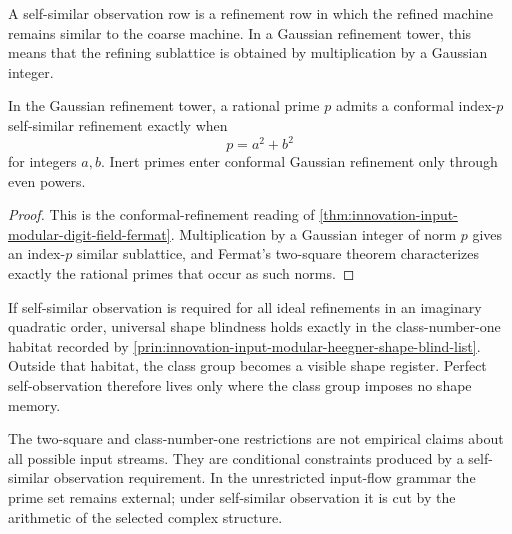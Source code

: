 \begin{definition}
\label{def:innovation-input-self-similar-observation-row}
A self-similar observation row is a refinement row in which the refined
machine remains similar to the coarse machine. In a Gaussian refinement
tower, this means that the refining sublattice is obtained by multiplication
by a Gaussian integer.
\end{definition}

\begin{theorem}
\label{thm:innovation-input-two-square-admissibility}
In the Gaussian refinement tower, a rational prime $p$ admits a
conformal index-$p$ self-similar refinement exactly when
$$
p=a^2+b^2
$$
for integers $a,b$. Inert primes enter conformal Gaussian refinement only
through even powers.
\end{theorem}

\begin{proof}
This is the conformal-refinement reading of
\autoref{thm:innovation-input-modular-digit-field-fermat}. Multiplication
by a Gaussian integer of norm $p$ gives an index-$p$ similar sublattice,
and Fermat's two-square theorem characterizes exactly the rational primes
that occur as such norms.
\end{proof}

\begin{principle}
\label{prin:innovation-input-heegner-habitat-self-observation}
If self-similar observation is required for all ideal refinements in an
imaginary quadratic order, universal shape blindness holds exactly in the
class-number-one habitat recorded by
\autoref{prin:innovation-input-modular-heegner-shape-blind-list}. Outside
that habitat, the class group becomes a visible shape register. Perfect
self-observation therefore lives only where the class group imposes no
shape memory.
\end{principle}

\begin{principle}
\label{prin:innovation-input-arithmetic-constraint-self-observation}
The two-square and class-number-one restrictions are not empirical claims
about all possible input streams. They are conditional constraints produced
by a self-similar observation requirement. In the unrestricted input-flow
grammar the prime set remains external; under self-similar observation it
is cut by the arithmetic of the selected complex structure.
\end{principle}


